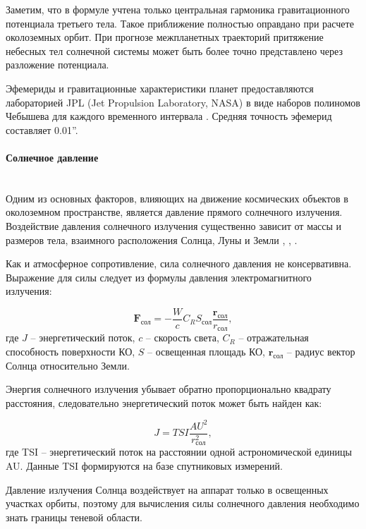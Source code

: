 Заметим, что в формуле учтена только центральная гармоника гравитационного потенциала третьего тела.
Такое приближение полностью оправдано при расчете околоземных орбит.
При прогнозе межпланетных траекторий притяжение небесных тел солнечной системы может быть 
более точно представлено через разложение потенциала.

Эфемериды и гравитационные характеристики планет предоставляются лабораторией JPL 
(Jet Propulsion Laboratory, NASA) в виде наборов полиномов Чебышева для
каждого временного интервала \cite{standish1998}. Средняя точность эфемерид составляет 0.01''.
\newpage
\paragraph{Солнечное давление} \mbox{} \\

Одним из основных факторов, влияющих на движение космических объектов в околоземном пространстве, является давление прямого солнечного излучения. Воздействие
давления солнечного излучения существенно зависит от массы и размеров тела, взаимного
расположения Солнца, Луны и Земли \cite{Musen1960}, \cite{Parkinson1960}, \cite{Vallado2013-ee}.

Как и атмосферное сопротивление, сила солнечного давления не консервативна. Выражение для силы следует из формулы давления
электромагнитного излучения:

\begin{equation*}
    \mathbf{F}_{\text{сол}} = -\frac{W}{c} C_R S_{\text{сол}} \frac{\mathbf{r}_{\text{сол}}}{r_{\text{сол}}},
\end{equation*}
где $J$ -- энергетический поток, $c$ -- скорость света,
$C_R$ -- отражательная способность поверхности КО,
$S$ -- освещенная площадь КО,
$\mathbf{r}_{\text{сол}}$ -- радиус вектор Солнца относительно Земли.

Энергия солнечного излучения убывает обратно пропорционально квадрату расстояния, следовательно
энергетический поток может быть найден как:

\begin{equation*}
    J = TSI \frac{AU^2}{r^2_{\text{сол}}},
\end{equation*}
где TSI -- энергетический поток на расстоянии одной астрономической единицы AU.
Данные TSI формируются на базе спутниковых измерений.

Давление излучения Солнца воздействует на аппарат только в освещенных участках орбиты,
поэтому для вычисления силы солнечного давления необходимо знать границы теневой области.

